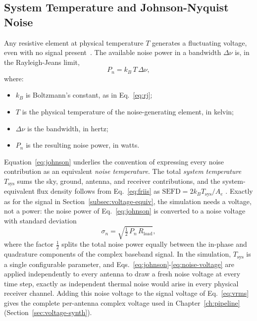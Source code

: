 \subsection{System Temperature and Johnson-Nyquist Noise}
\label{subsec:johnson-noise}
Any resistive element at physical temperature $T$ generates a fluctuating
voltage, even with no signal present~\citep{nyquist1928}. The available noise
power in a bandwidth $\Delta\nu$ is, in the Rayleigh-Jeans limit,
\begin{equation}
  P_n = k_B\,T\,\Delta\nu ,
  \label{eq:johnson}
\end{equation}
where:
\begin{itemize}[leftmargin=1.5em,itemsep=1pt,topsep=2pt]
  \item $k_B$ is Boltzmann's constant, as in Eq.~\eqref{eq:rj};
  \item $T$ is the physical temperature of the noise-generating element, in
        kelvin;
  \item $\Delta\nu$ is the bandwidth, in hertz;
  \item $P_n$ is the resulting noise power, in watts.
\end{itemize}
Equation~\eqref{eq:johnson} underlies the convention of expressing every
noise contribution as an equivalent \emph{noise temperature}. The total
\emph{system temperature} $T_\mathrm{sys}$ sums the sky, ground, antenna, and
receiver contributions, and the system-equivalent flux density follows from
Eq.~\eqref{eq:friis} as $\mathrm{SEFD}=2k_B T_\mathrm{sys}/A_e$
\citep{tms2017,kraus1986}. Exactly as for the signal in
Section~\ref{subsec:voltage-equiv}, the simulation needs a voltage, not a
power: the noise power of Eq.~\eqref{eq:johnson} is converted to a noise
voltage with standard deviation
\begin{equation}
  \sigma_n = \sqrt{\tfrac{1}{2}\,P_n\,R_\mathrm{load}} ,
  \label{eq:noise-voltage}
\end{equation}
where the factor $\tfrac12$ splits the total noise power equally between the
in-phase and quadrature components of the complex baseband signal. In the
simulation, $T_\mathrm{sys}$ is a single configurable parameter, and
Eqs.~\eqref{eq:johnson}-\eqref{eq:noise-voltage} are applied independently to
every antenna to draw a fresh noise voltage at every time step, exactly as
independent thermal noise would arise in every physical receiver channel.
Adding this noise voltage to the signal voltage of Eq.~\eqref{eq:vrms} gives
the complete per-antenna complex voltage used in Chapter~\ref{ch:pipeline}
(Section~\ref{sec:voltage-synth}).

